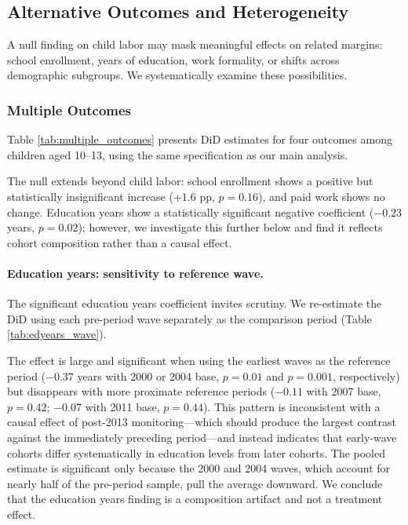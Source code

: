 \documentclass[12pt]{article}
\begin{document}
\subsection{Alternative Outcomes and Heterogeneity}

A null finding on child labor may mask meaningful effects on related margins: school enrollment, years of education, work formality, or shifts across demographic subgroups. We systematically examine these possibilities.

\subsubsection{Multiple Outcomes}

Table \ref{tab:multiple_outcomes} presents DiD estimates for four outcomes among children aged 10--13, using the same specification as our main analysis.



The null extends beyond child labor: school enrollment shows a positive but statistically insignificant increase ($+1.6$ pp, $p = 0.16$), and paid work shows no change. Education years show a statistically significant negative coefficient ($-0.23$ years, $p = 0.02$); however, we investigate this further below and find it reflects cohort composition rather than a causal effect.

\paragraph{Education years: sensitivity to reference wave.} The significant education years coefficient invites scrutiny. We re-estimate the DiD using each pre-period wave separately as the comparison period (Table \ref{tab:edyears_wave}).



The effect is large and significant when using the earliest waves as the reference period ($-0.37$ years with 2000 or 2004 base, $p = 0.01$ and $p = 0.001$, respectively) but disappears with more proximate reference periods ($-0.11$ with 2007 base, $p = 0.42$; $-0.07$ with 2011 base, $p = 0.44$). This pattern is inconsistent with a causal effect of post-2013 monitoring---which should produce the largest contrast against the immediately preceding period---and instead indicates that early-wave cohorts differ systematically in education levels from later cohorts. The pooled estimate is significant only because the 2000 and 2004 waves, which account for nearly half of the pre-period sample, pull the average downward. We conclude that the education years finding is a composition artifact and not a treatment effect.
\end{document}
